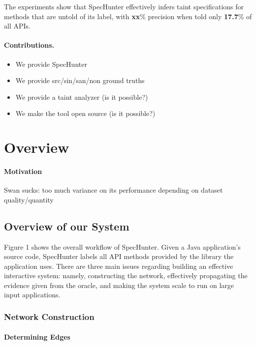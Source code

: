 \documentclass[sigconf,review,anonymous]{acmart}\settopmatter{printfolios=true,printccs=false,printacmref=false}
\begin{document}
The experiments show that SpecHunter effectively infers taint specifications for
methods that are untold of its label, with \textbf{xx}\% precision when told only
\textbf{17.7}\% of all APIs.


\paragraph{Contributions.}

\begin{itemize}
  \item We provide SpecHunter
  \item We provide src/sin/san/non ground truths
  \item We provide a taint analyzer (is it possible?)
  \item We make the tool open source (is it possible?)
\end{itemize}

\section{Overview}

\paragraph{Motivation}

Swan sucks: too much variance on its performance depending on dataset quality/quantity

\subsection{Overview of our System}


Figure 1 shows the overall workflow of SpecHunter. Given a Java application's
source code, SpecHunter labels all API methods provided by the library the application
uses. There are three main issues regarding building an effective interactive system:
namely, constructing the network, effectively propagating the evidence given from the
oracle, and making the system scale to run on large input applications.

\subsubsection{Network Construction}

\paragraph{Determining Edges}
\end{document}

